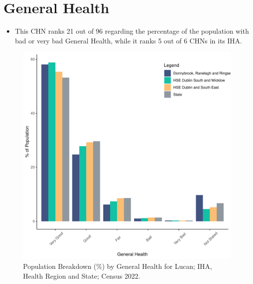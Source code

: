 \documentclass{article}
\begin{document}
\pagebreak

\section{General Health}\label{sect:GenHealth}
\begin{itemize}
\item  This CHN ranks  21 out of 96 regarding the percentage of the population with bad or very bad General Health, while it ranks   5 out of 6 CHNs in its IHA.
\end{itemize}
\begin{figure}[h]
	\centering
	\includegraphics[width = 150mm]{../figures/GenED.pdf}
	\caption{Population Breakdown (\%) by General Health for Lucan; IHA, Health Region and State;  Census 2022.}
	\label{fig:2ae19629-1a6a-13a3-e055-000000000001}
	\end{figure}
\end{document}
